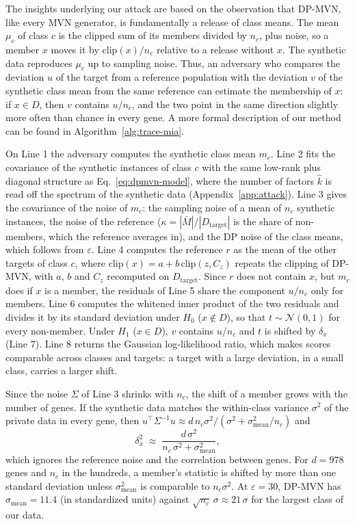 \documentclass{article}
\newcommand{\dpmvn}{DP-MVN}
\begin{document}
The insights underlying our attack are based on the observation that \dpmvn{}, like every MVN generator, is fundamentally a release of class means. The mean $\mu_c$ of class $c$ is the clipped sum of its members divided by $n_c$, plus noise, so a member $x$ moves it by $\mathrm{clip}(x)/n_c$ relative to a release without $x$. The synthetic data reproduces $\mu_c$ up to sampling noise. Thus, an adversary who compares the deviation $u$ of the target from a reference population with the deviation $v$ of the synthetic class mean from the same reference can estimate the membership of $x$: if $x\in D$, then $v$ contains $u/n_c$, and the two point in the same direction slightly more often than chance in every gene. A more formal description of our method can be found in Algorithm~\ref{alg:trace-mia}.

On Line 1 the adversary computes the synthetic class mean $m_c$. Line 2 fits the covariance of the synthetic instances of class $c$ with the same low-rank plus diagonal structure as Eq.~\eqref{eq:dpmvn-model}, where the number of factors $\hat k$ is read off the spectrum of the synthetic data (Appendix~\ref{app:attack}). Line 3 gives the covariance of the noise of $m_c$: the sampling noise of a mean of $n_c$ synthetic instances, the noise of the reference ($\kappa=|\bar M|/|D_\mathrm{target}|$ is the share of non-members, which the reference averages in), and the DP noise of the class means, which follows from $\varepsilon$. Line 4 computes the reference $r$ as the mean of the other targets of class $c$, where $\mathrm{clip}(x)=a+b\,\mathrm{clip}(z, C_z)$ repeats the clipping of \dpmvn{}, with $a$, $b$ and $C_z$ recomputed on $D_\mathrm{target}$. Since $r$ does not contain $x$, but $m_c$ does if $x$ is a member, the residuals of Line 5 share the component $u/n_c$ only for members. Line 6 computes the whitened inner product of the two residuals and divides it by its standard deviation under $H_0$ ($x\notin D$), so that $t\sim\mathcal N(0,1)$ for every non-member. Under $H_1$ ($x\in D$), $v$ contains $u/n_c$ and $t$ is shifted by $\delta_x$ (Line 7). Line 8 returns the Gaussian log-likelihood ratio, which makes scores comparable across classes and targets: a target with a large deviation, in a small class, carries a larger shift.

Since the noise $\Sigma$ of Line 3 shrinks with $n_c$, the shift of a member grows with the number of genes. If the synthetic data matches the within-class variance $\sigma^2$ of the private data in every gene, then $u^\top\Sigma^{-1}u \approx d\,n_c\sigma^2/(\sigma^2+\sigma_\mathrm{mean}^2/n_c)$ and
\begin{equation}
  \delta_x^2 \;\approx\; \frac{d\,\sigma^2}{n_c\,\sigma^2 + \sigma_\mathrm{mean}^2},
  \label{eq:shift}
\end{equation}
which ignores the reference noise and the correlation between genes. For $d=978$ genes and $n_c$ in the hundreds, a member's statistic is shifted by more than one standard deviation unless $\sigma_\mathrm{mean}^2$ is comparable to $n_c\sigma^2$. At $\varepsilon=30$, \dpmvn{} has $\sigma_\mathrm{mean}=11.4$ (in standardized units) against $\sqrt{n_c}\,\sigma\approx 21\,\sigma$ for the largest class of our data.
\end{document}
